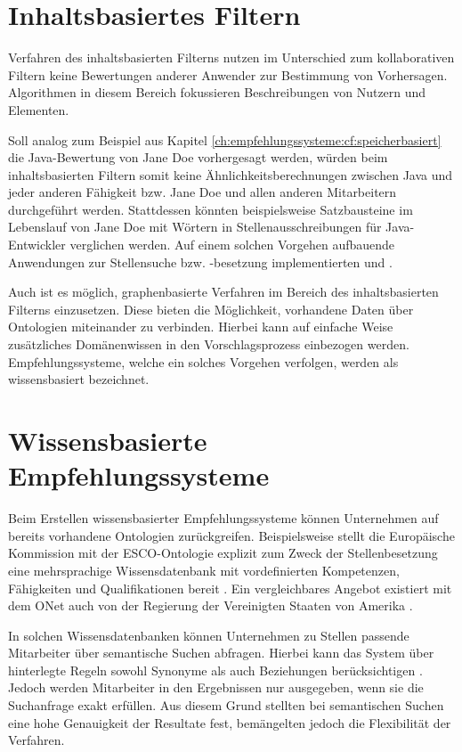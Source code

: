 \section{Inhaltsbasiertes Filtern}
\label{ch:empfehlungssysteme:inhaltsbasiertesFiltern}
Verfahren des inhaltsbasierten Filterns nutzen im Unterschied zum kollaborativen Filtern keine Bewertungen anderer Anwender zur Bestimmung von Vorhersagen. Algorithmen in diesem Bereich fokussieren Beschreibungen von Nutzern und Elementen. \cite[S. 139f.]{recommenderSystems:2016}

Soll analog zum Beispiel aus Kapitel \ref{ch:empfehlungssysteme:cf:speicherbasiert} die Java-Bewertung von Jane Doe vorhergesagt werden, würden beim inhaltsbasierten Filtern somit keine Ähnlichkeitsberechnungen zwischen Java und jeder anderen Fähigkeit bzw. Jane Doe und allen anderen Mitarbeitern durchgeführt werden. Stattdessen könnten beispielsweise Satzbausteine im Lebenslauf von Jane Doe mit Wörtern in Stellenausschreibungen für Java-Entwickler verglichen werden. Auf einem solchen Vorgehen aufbauende Anwendungen zur Stellensuche bzw. \mbox{-besetzung} implementierten \textcite[S. 4ff.]{guo:2016} und \textcite[S. 3ff.]{prospect:2010}.

Auch ist es möglich, graphenbasierte Verfahren im Bereich des inhaltsbasierten Filterns  einzusetzen. Diese bieten die Möglichkeit, vorhandene Daten über Ontologien miteinander zu verbinden. Hierbei kann auf einfache Weise zusätzliches Domänenwissen in den Vorschlagsprozess einbezogen werden. Empfehlungssysteme, welche ein solches Vorgehen verfolgen, werden als wissensbasiert bezeichnet. \cite[S. 167ff.]{recommenderSystems:2016}

\section{Wissensbasierte Empfehlungssysteme}
\label{ch:empfehlungssysteme:wissensbasierteAnsaetze}
Beim Erstellen wissensbasierter Empfehlungssysteme können Unternehmen auf bereits vorhandene Ontologien zurückgreifen. Beispielsweise stellt die Europäische Kommission mit der \ac{ESCO}-Ontologie explizit zum Zweck der Stellenbesetzung eine mehrsprachige Wissensdatenbank mit vordefinierten Kompetenzen, Fähigkeiten und Qualifikationen bereit \cite[S. 1ff.]{leVrang:2014}. Ein vergleichbares Angebot existiert mit dem \ac{ONet} auch von der Regierung der Vereinigten Staaten von Amerika \cite[S. 2]{aCombinedRepresentation:2018}.

In solchen Wissensdatenbanken können Unternehmen zu Stellen passende Mitarbeiter über semantische Suchen abfragen. Hierbei kann das System über hinterlegte Regeln sowohl Synonyme als auch Beziehungen berücksichtigen \cite[S. 2]{balachander:2018}\cite[S. 2f.]{singto:2013}. Jedoch werden Mitarbeiter in den Ergebnissen nur ausgegeben, wenn sie die Suchanfrage exakt erfüllen. Aus diesem Grund stellten \textcite[S. 3]{bianchini:2008} bei semantischen Suchen eine hohe Genauigkeit der Resultate fest, bemängelten jedoch die Flexibilität der Verfahren.

